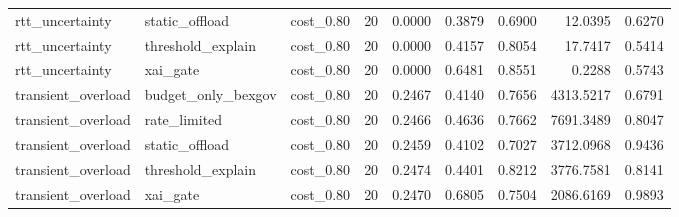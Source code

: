 \begin{table}[t]
\begin{tabular}{lllrrrrrr}
rtt\_uncertainty & static\_offload & cost\_0.80 & 20 & 0.0000 & 0.3879 & 0.6900 & 12.0395 & 0.6270 \\
rtt\_uncertainty & threshold\_explain & cost\_0.80 & 20 & 0.0000 & 0.4157 & 0.8054 & 17.7417 & 0.5414 \\
rtt\_uncertainty & xai\_gate & cost\_0.80 & 20 & 0.0000 & 0.6481 & 0.8551 & 0.2288 & 0.5743 \\
transient\_overload & budget\_only\_bexgov & cost\_0.80 & 20 & 0.2467 & 0.4140 & 0.7656 & 4313.5217 & 0.6791 \\
transient\_overload & rate\_limited & cost\_0.80 & 20 & 0.2466 & 0.4636 & 0.7662 & 7691.3489 & 0.8047 \\
transient\_overload & static\_offload & cost\_0.80 & 20 & 0.2459 & 0.4102 & 0.7027 & 3712.0968 & 0.9436 \\
transient\_overload & threshold\_explain & cost\_0.80 & 20 & 0.2474 & 0.4401 & 0.8212 & 3776.7581 & 0.8141 \\
transient\_overload & xai\_gate & cost\_0.80 & 20 & 0.2470 & 0.6805 & 0.7504 & 2086.6169 & 0.9893 \\
\bottomrule
\end{tabular}
\end{table}
